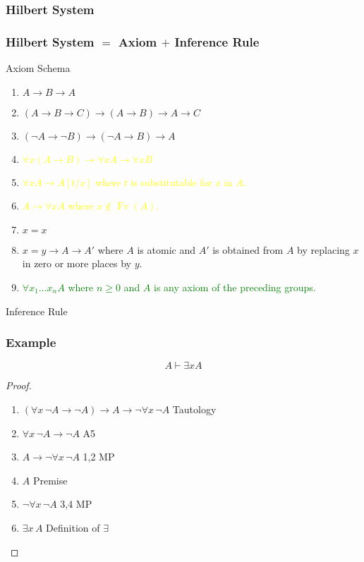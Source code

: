 \documentclass[UTF8,aspectratio=43,11pt,colorlinks,compress,openany]{beamer}%
\begin{document}
\subsubsection{Hilbert System}

\begin{frame}\frametitle{Hilbert System $=$ Axiom $+$ Inference Rule}\vspace{-1ex}
				\begin{block}{Axiom Schema}
					\begin{enumerate}
						\item $A\to B\to A$
						\item $(A\to B\to C)\to(A\to B)\to A\to C$
						\item $(\neg A\to\neg B)\to(\neg A\to B)\to A$
						\item \textcolor{yellow}{$\forall x(A\to B)\to\forall x A\to\forall x B$}
						\item \textcolor{yellow}{$\forall x A\to A[t/x]$ where $t$ is substitutable for $x$ in $A$.}
						\item \textcolor{yellow}{$A\to\forall x A$ where $x\notin \operatorname{Fv}(A)$.}
						\item $x=x$
						\item $x=y\to A\to A'$ where $A$ is atomic and $A'$ is obtained from $A$ by replacing $x$ in zero or more places by $y$.
						\item \textcolor{green}{$\forall x_1\dots x_n A$ where $n\geq 0$ and $A$ is any axiom of the preceding groups.}
					\end{enumerate}
				\end{block}
				\begin{block}{Inference Rule}
					\begin{prooftree}
						\alwaysSingleLine
						\RightLabel{\textcolor{yellow}{[MP]}}
					\end{prooftree}
				\end{block}
\end{frame}

\begin{frame}\frametitle{Example}
	\begin{theorem}
		\[A\vdash\exists x A\]
	\end{theorem}
	\begin{proof}
		\begin{enumerate}
			\item $(\forall x\, \neg A \to \neg A) \to A \to \neg \forall x\, \neg A$ \hfill Tautology
			\item $\forall x\, \neg A \to \neg A$ \hfill A5
			\item $A\to \neg \forall x\, \neg A$ \hfill 1,2 MP
			\item $A$ \hfill Premise
			\item $\neg \forall x\, \neg A$ \hfill 3,4 MP
			\item $\exists x\, A$ \hfill Definition of $\exists$
		\end{enumerate}
	\end{proof}
\end{frame}
\end{document}
